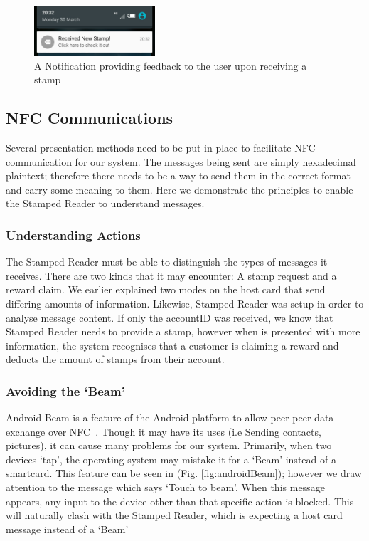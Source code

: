 \begin{figure}[H]
 \centering
  \includegraphics[width=0.40\textwidth]{img/notification.jpg}
     \caption{A Notification providing feedback to the user upon receiving a stamp}
     \label{fig:notification}
\end{figure}

\subsection{NFC Communications}
Several presentation methods need to be put in place to facilitate NFC communication for our system. The messages being sent are simply hexadecimal plaintext; therefore there needs to be a way to send them in the correct format and carry some meaning to them. Here we demonstrate the principles to enable the Stamped Reader to understand messages.

\subsubsection{Understanding Actions}
\label{sec:understanding}
The Stamped Reader must be able to distinguish the types of messages it receives. There are two kinds that it may encounter: A stamp request and a reward claim. We earlier explained two modes on the host card that send differing amounts of information. Likewise, Stamped Reader was setup in order to analyse message content. If only the accountID was received, we know that Stamped Reader needs to provide a stamp, however when is presented with more information, the system recognises that a customer is claiming a reward and deducts the amount of stamps from their account.

\subsubsection{Avoiding the `Beam'}
Android Beam is a feature of the Android platform to allow peer-peer data exchange over NFC~\cite{androidBeam}. Though it may have its uses (i.e Sending contacts, pictures), it can cause many problems for our system. Primarily, when two devices `tap', the operating system may mistake it for a `Beam' instead of a smartcard. This feature can be seen in (Fig. \ref{fig:androidBeam}); however we draw attention to the message which says `Touch to beam'. When this message appears, any input to the device other than that specific action is blocked. This will naturally clash with the Stamped Reader, which is expecting a host card message instead of a `Beam'

